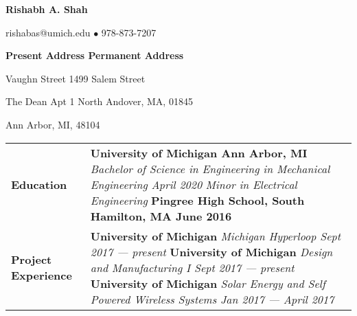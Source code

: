 \documentclass[11pt]{article}
\begin{document}
\begin{center}
	{\large\textbf{Rishabh A. Shah}}

	rishabas@umich.edu $\bullet$ 978-873-7207 \\
\end{center}

\noindent\textbf{Present Address \hfill Permanent Address}

 Vaughn Street \hfill 1499 Salem Street

\noindent The Dean Apt 1 \hfill North Andover, MA, 01845

\noindent Ann Arbor, MI, 48104 \\

\begin{table}[H]
	\centering
	\begin{tabularx}{\textwidth}{@{}X p{5.25in} @{}}
		\textbf{Education} & \textbf{University of Michigan \hfill Ann Arbor, MI} \newline \textit{Bachelor of Science in Engineering in Mechanical Engineering \hfill April 2020} \newline \textit{Minor in Electrical Engineering} \newline \textbf{Pingree High School, South Hamilton, MA \hfill June 2016} \\

		\textbf{Project Experience} & \textbf{University of Michigan} \newline \textit{Michigan Hyperloop \hfill Sept 2017 --- present} \newline \textbf{University of Michigan} \newline \textit{Design and Manufacturing I \hfill Sept 2017 --- present } \newline \textbf{University of Michigan} \newline \textit{Solar Energy and Self Powered Wireless Systems \hfill Jan 2017 --- April 2017} \\

		
	\end{tabularx}
\end{table}
\end{document}
